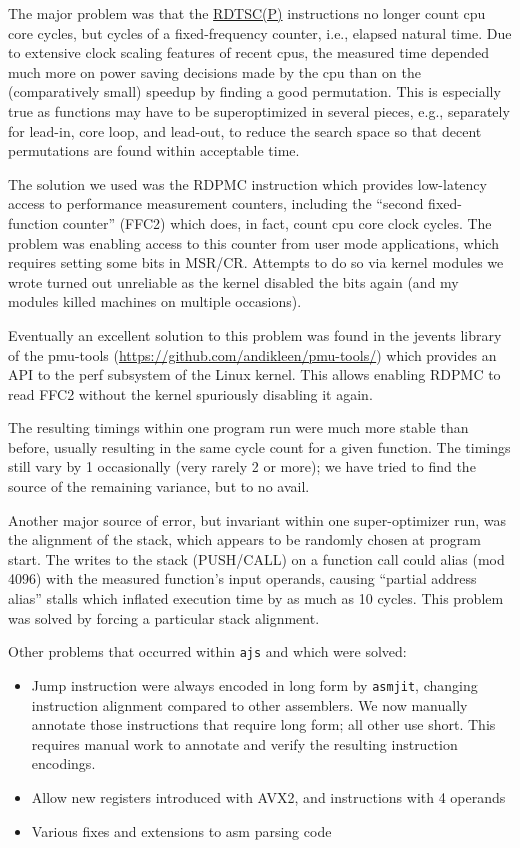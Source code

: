 The major problem was that the
\href{https://en.wikipedia.org/wiki/Time_Stamp_Counter}{RDTSC(P)}
instructions no longer count cpu core cycles, but cycles of a
fixed-frequency counter, i.e., elapsed natural time. Due to extensive
clock scaling features of recent cpus, the measured time depended much
more on power saving decisions made by the cpu than on the
(comparatively small) speedup by finding a good permutation. This is
especially true as functions may have to be superoptimized in several
pieces, e.g., separately for lead-in, core loop, and lead-out, to reduce
the search space so that decent permutations are found within acceptable
time.

The solution we used was the RDPMC instruction which provides
low-latency access to performance measurement counters, including the
``second fixed- function counter'' (FFC2) which does, in fact, count cpu
core clock cycles. The problem was enabling access to this counter from
user mode applications, which requires setting some bits in MSR/CR.
Attempts to do so via kernel modules we wrote turned out unreliable as
the kernel disabled the bits again (and my modules killed machines on
multiple occasions).

Eventually an excellent solution to this problem was found in the
jevents library of the pmu-tools
(\url{https://github.com/andikleen/pmu-tools/}) which provides an API to
the perf subsystem of the Linux kernel. This allows enabling RDPMC to
read FFC2 without the kernel spuriously disabling it again.

The resulting timings within one program run were much more stable than
before, usually resulting in the same cycle count for a given function.
The timings still vary by 1 occasionally (very rarely 2 or more); we
have tried to find the source of the remaining variance, but to no
avail.

Another major source of error, but invariant within one super-optimizer
run, was the alignment of the stack, which appears to be randomly chosen
at program start. The writes to the stack (PUSH/CALL) on a function call
could alias (mod 4096) with the measured function's input operands,
causing ``partial address alias'' stalls which inflated execution time
by as much as 10 cycles. This problem was solved by forcing a particular
stack alignment.

Other problems that occurred within \texttt{ajs} and which were solved:

\begin{itemize}
\tightlist
\item
  Jump instruction were always encoded in long form by \texttt{asmjit},
  changing instruction alignment compared to other assemblers. We now
  manually annotate those instructions that require long form; all other
  use short. This requires manual work to annotate and verify the
  resulting instruction encodings.
\item
  Allow new registers introduced with AVX2, and instructions with 4
  operands
\item
  Various fixes and extensions to asm parsing code
\end{itemize}

